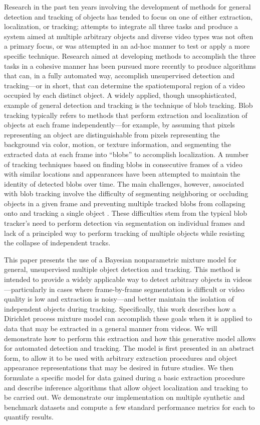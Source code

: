 \documentclass[twocolumn, final]{svjour3}
\begin{document}
Research in the past ten years involving the development of methods for general detection and tracking of objects has tended to focus on one of either extraction, localization, or tracking; attempts to integrate all three tasks and produce a system aimed at multiple arbitrary objects and diverse video types was not often a primary focus, or was attempted in an ad-hoc manner to test or apply a more specific technique. Research aimed at developing methods to accomplish the three tasks in a cohesive manner has been pursued more recently to produce algorithms that can, in a fully automated way, accomplish unsupervised detection and tracking---or in short, that can determine the spatiotemporal region of a video occupied by each distinct object. A widely applied, though unsophisticated, example of general detection and tracking is the technique of blob tracking. Blob tracking typically refers to methods that perform extraction and localization of objects at each frame independently---for example, by assuming that pixels representing an object are distinguishable from pixels representing the background via color, motion, or texture information, and segmenting the extracted data at each frame into ``blobs'' to accomplish localization. A number of tracking techniques based on finding blobs in consecutive frames of a video with similar locations and appearances have been attempted to maintain the identity of detected blobs over time. The main challenges, however, associated with blob tracking involve the difficulty of segmenting neighboring or occluding objects in a given frame \cite{zhao2004tracking} and preventing multiple tracked blobs from collapsing onto and tracking a single object \cite{vermaak_2003}. These difficulties stem from the typical blob tracker's need to perform detection via segmentation on individual frames and lack of a principled way to perform tracking of multiple objects while resisting the collapse of independent tracks.

This paper presents the use of a Bayesian nonparametric mixture model for general, unsupervised multiple object detection and tracking. This method is intended to provide a widely applicable way to detect arbitrary objects in videos---particularly in cases where frame-by-frame segmentation is difficult or video quality is low and extraction is noisy---and better maintain the isolation of independent objects during tracking. Specifically, this work describes how a Dirichlet process mixture model can accomplish these goals when it is applied to data that may be extracted in a general manner from videos. We will demonstrate how to perform this extraction and how this generative model allows for automated detection and tracking. The model is first presented in an abstract form, to allow it to be used with arbitrary extraction procedures and object appearance representations that may be desired in future studies. We then formulate a specific model for data gained during a basic extraction procedure and describe inference algorithms that allow object localization and tracking to be carried out. We demonstrate our implementation on multiple synthetic and benchmark datasets and compute a few standard performance metrics for each to quantify results.
\end{document}
